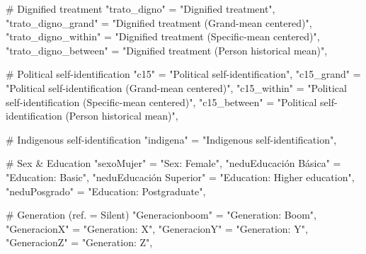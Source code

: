 \documentclass[
  spanish,
  a4paper,
  oneside]{scrbook}
\newenvironment{Shaded}{\begin{snugshade}}{\end{snugshade}}
\newcommand{\CommentTok}[1]{\textcolor[rgb]{0.37,0.37,0.37}{#1}}
\newcommand{\NormalTok}[1]{\textcolor[rgb]{0.00,0.23,0.31}{#1}}
\newcommand{\OtherTok}[1]{\textcolor[rgb]{0.00,0.23,0.31}{#1}}
\newcommand{\StringTok}[1]{\textcolor[rgb]{0.13,0.47,0.30}{#1}}
\begin{document}
\begin{Shaded}
\begin{Highlighting}[]
  \CommentTok{\# Dignified treatment}
  \StringTok{"trato\_digno"}            \OtherTok{=} \StringTok{"Dignified treatment"}\NormalTok{,}
  \StringTok{"trato\_digno\_grand"}      \OtherTok{=} \StringTok{"Dignified treatment (Grand{-}mean centered)"}\NormalTok{,}
  \StringTok{"trato\_digno\_within"}     \OtherTok{=} \StringTok{"Dignified treatment (Specific{-}mean centered)"}\NormalTok{,}
  \StringTok{"trato\_digno\_between"}    \OtherTok{=} \StringTok{"Dignified treatment (Person historical mean)"}\NormalTok{,}

  \CommentTok{\# Political self{-}identification}
  \StringTok{"c15"}                    \OtherTok{=} \StringTok{"Political self{-}identification"}\NormalTok{,}
  \StringTok{"c15\_grand"}              \OtherTok{=} \StringTok{"Political self{-}identification (Grand{-}mean centered)"}\NormalTok{,}
  \StringTok{"c15\_within"}             \OtherTok{=} \StringTok{"Political self{-}identification (Specific{-}mean centered)"}\NormalTok{,}
  \StringTok{"c15\_between"}            \OtherTok{=} \StringTok{"Political self{-}identification (Person historical mean)"}\NormalTok{,}

  \CommentTok{\# Indigenous self{-}identification}
  \StringTok{"indigena"}               \OtherTok{=} \StringTok{"Indigenous self{-}identification"}\NormalTok{,}

  \CommentTok{\# Sex \& Education}
  \StringTok{"sexoMujer"}              \OtherTok{=} \StringTok{"Sex: Female"}\NormalTok{,}
  \StringTok{"neduEducación Básica"}   \OtherTok{=} \StringTok{"Education: Basic"}\NormalTok{,}
  \StringTok{"neduEducación Superior"} \OtherTok{=} \StringTok{"Education: Higher education"}\NormalTok{,}
  \StringTok{"neduPosgrado"}           \OtherTok{=} \StringTok{"Education: Postgraduate"}\NormalTok{,}

  \CommentTok{\# Generation (ref. = Silent)}
  \StringTok{"Generacionboom"}         \OtherTok{=} \StringTok{"Generation: Boom"}\NormalTok{,}
  \StringTok{"GeneracionX"}            \OtherTok{=} \StringTok{"Generation: X"}\NormalTok{,}
  \StringTok{"GeneracionY"}            \OtherTok{=} \StringTok{"Generation: Y"}\NormalTok{,}
  \StringTok{"GeneracionZ"}            \OtherTok{=} \StringTok{"Generation: Z"}\NormalTok{,}


\end{Highlighting}
\end{Shaded}
\end{document}
